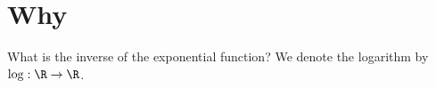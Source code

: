
\section*{Why}

What is the inverse of the exponential function?
We denote the logarithm by $\log : \R  \to \R $.

